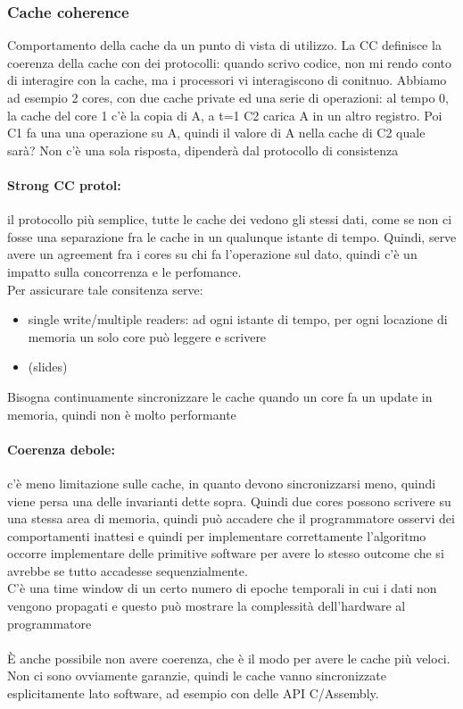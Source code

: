 \documentclass[12pt, oneside]{extbook} %
\begin{document}
\subsubsection{Cache coherence}
Comportamento della cache da un punto di vista di utilizzo. La CC definisce la coerenza della cache con dei protocolli: quando scrivo codice, non mi rendo conto di interagire con la cache, ma i processori vi interagiscono di conitnuo. Abbiamo ad esempio 2 cores, con due cache private ed una serie di operazioni:
al tempo 0, la cache del core 1 c'è la copia di A, a t=1 C2 carica A in un altro registro. Poi C1 fa una una operazione su A, quindi il valore di A nella cache di C2 quale sarà? Non c'è una sola risposta, dipenderà dal protocollo di consistenza
\paragraph{Strong CC protol:}il protocollo più semplice, tutte le cache dei vedono gli stessi dati, come se non ci fosse una separazione fra le cache in un qualunque istante di tempo. Quindi, serve avere un agreement fra i cores su chi fa l'operazione sul dato, quindi c'è un impatto sulla concorrenza e le perfomance.\\ Per assicurare tale consitenza serve:
\begin{itemize}
\item single write/multiple readers: ad ogni istante di tempo, per ogni locazione di memoria un solo core può leggere e scrivere
\item (slides)
\end{itemize}
Bisogna continuamente sincronizzare le cache quando un core fa un update in memoria, quindi non è molto performante
\paragraph{Coerenza debole:} c'è meno limitazione sulle cache, in quanto devono sincronizzarsi meno, quindi viene persa una delle invarianti dette sopra. Quindi due cores possono scrivere su una stessa area di memoria, quindi può accadere che il programmatore osservi dei comportamenti inattesi e quindi per implementare correttamente l'algoritmo occorre implementare delle primitive software per avere lo stesso outcome che si avrebbe se tutto accadesse sequenzialmente.\\ C'è una time window di un certo numero di epoche temporali in cui i dati non vengono propagati e questo può mostrare la complessità dell'hardware al programmatore\\\\ È anche possibile non avere coerenza, che è il modo per avere le cache più veloci. Non ci sono ovviamente garanzie, quindi le cache vanno sincronizzate esplicitamente lato software, ad esempio con delle API C/Assembly.
\end{document}
